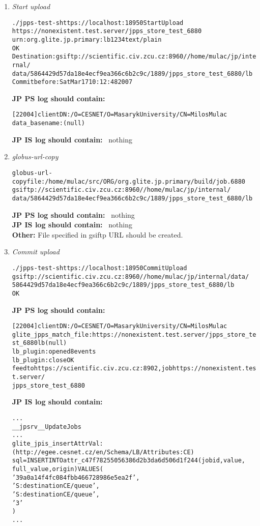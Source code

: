 \documentclass{egee}
\def\jpps{\noindent\textbf{JP PS log should contain: }}
\def\jpis{\noindent\textbf{JP IS log should contain: }}
\begin{document}
\begin{enumerate}
 \item \emph{Start upload}
  \begin{alltt}
	./jpps-test -s https://localhost:18950 StartUpload 
	https://nonexistent.test.server/jpps_store_test_6880 
	urn:org.glite.jp.primary:lb 1234 text/plain
	OK
	Destination: gsiftp://scientific.civ.zcu.cz:8960//home/mulac/jp/internal/
	data/5864429d57da18e4ecf9ea366c6b2c9c/1889/jpps_store_test_6880/lb
	Commit before: Sat Mar 17 10:12:48 2007
  \end{alltt}
  \jpps\
  \begin{alltt}
	[22004] client DN: /O=CESNET/O=Masaryk University/CN=Milos Mulac
	data_basename: (null)
  \end{alltt}
  \jpis\
	nothing
 \item \emph{globus-url-copy}
  \begin{alltt}
	globus-url-copy file:/home/mulac/src/ORG/org.glite.jp.primary/build/job.6880
	gsiftp://scientific.civ.zcu.cz:8960//home/mulac/jp/internal/
	data/5864429d57da18e4ecf9ea366c6b2c9c/1889/jpps_store_test_6880/lb
  \end{alltt}
  \jpps\
	nothing \\
  \jpis\
	nothing \\
  \noindent\textbf{Other:}
	File specified in gsiftp URL should be created.
 \item \emph{Commit upload}
  \begin{alltt}
	./jpps-test -s https://localhost:18950 CommitUpload 
	gsiftp://scientific.civ.zcu.cz:8960//home/mulac/jp/internal/data/
	5864429d57da18e4ecf9ea366c6b2c9c/1889/jpps_store_test_6880/lb
	OK
  \end{alltt}
  \jpps\
  \begin{alltt}
	[22004] client DN: /O=CESNET/O=Masaryk University/CN=Milos Mulac
	glite_jpps_match_file: https://nonexistent.test.server/jpps_store_test_6880 lb (null)
	lb_plugin: opened 8 events
	lb_plugin: close OK
	feed to https://scientific.civ.zcu.cz:8902, job https://nonexistent.test.server/
	jpps_store_test_6880
  \end{alltt}
  \jpis\
  \begin{alltt}
	...
	__jpsrv__UpdateJobs
	...
	glite_jpis_insertAttrVal: (http://egee.cesnet.cz/en/Schema/LB/Attributes:CE) 
	sql=INSERT INTO attr_c47f78255056386d2b3da6d506d1f244 (jobid, value, 
	full_value, origin) VALUES (
        '39a0a14f4fc084fbb466728986e5ea2f',
        'S:destination CE/queue',
        'S:destination CE/queue',
        '3'
	)
	...
  \end{alltt}
 \end{enumerate}
\end{document}
